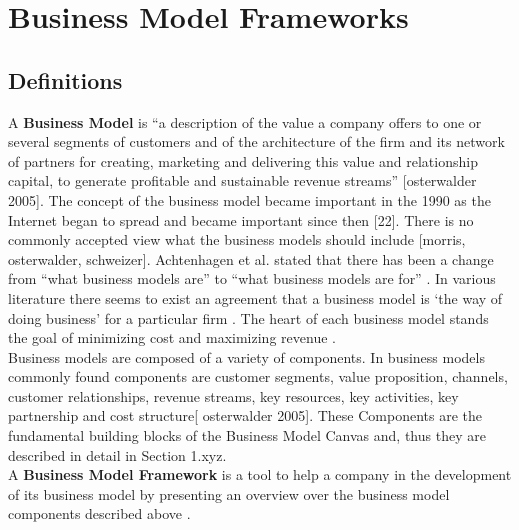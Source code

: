 \section{Business Model Frameworks}
	
	\subsection{Definitions}
		 A \textbf{Business Model} is ``a description of the value a company offers to one or several segments of customers and of the architecture of the firm and its network of partners for creating, marketing and delivering this value and relationship capital, to generate profitable and sustainable revenue streams'' [osterwalder 2005]. The concept of the business model became important in the 1990 as the Internet began to spread and became important since then [22]. There is no commonly accepted view what the business models should include [morris, osterwalder, schweizer]. Achtenhagen et al. stated that there has been a change from ``what business models are'' to ``what business models are for'' \cite{westerlund}. In various literature there seems to exist an agreement that a business model is `the way of doing business' for a particular firm \cite{westerlund}. The heart of each business model stands the goal of minimizing cost and maximizing revenue \cite{ju}.\\
		 Business models are composed of a variety of components. In business models commonly found components are customer segments, value proposition, channels, customer relationships, revenue streams, key resources, key activities, key partnership and cost structure[ osterwalder 2005]. These Components are the fundamental building blocks of the Business Model Canvas and, thus they are described in detail in Section 1.xyz. \\

		 A \textbf{Business Model Framework} is a tool to help a company in the development of its business model by presenting an overview over the business model components described above \cite{dijkman}.

